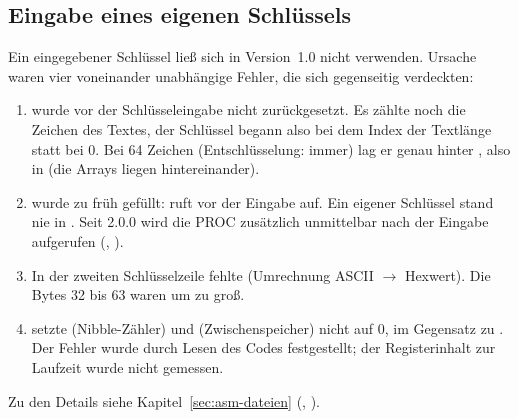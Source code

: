 \subsection{Eingabe eines eigenen Schlüssels}\label{sec:aend-schluessel}
Ein eingegebener Schlüssel ließ sich in Version~1.0 nicht verwenden. Ursache waren vier voneinander unabhängige Fehler, die sich gegenseitig verdeckten:
\begin{enumerate}[label=\arabic*.,noitemsep]
    \item {} wurde vor der Schlüsseleingabe nicht zurückgesetzt. Es zählte noch die Zeichen des Textes, der Schlüssel begann also bei dem Index der Textlänge statt bei 0. Bei 64 Zeichen (Entschlüsselung: immer) lag er genau hinter , also in  (die Arrays liegen hintereinander).
    \item {} wurde zu früh gefüllt:  ruft  vor der Eingabe auf. Ein eigener Schlüssel stand nie in . Seit 2.0.0 wird die PROC zusätzlich unmittelbar nach der Eingabe aufgerufen (, ).
    \item In der zweiten Schlüsselzeile fehlte  (Umrechnung ASCII $\to$ Hexwert). Die Bytes 32 bis 63 waren um  zu groß.
    \item {} setzte  (Nibble-Zähler) und  (Zwischenspeicher) nicht auf 0, im Gegensatz zu . Der Fehler wurde durch Lesen des Codes festgestellt; der Registerinhalt zur Laufzeit wurde nicht gemessen.
\end{enumerate}
Zu den Details siehe Kapitel~\ref{sec:asm-dateien} (, ).


